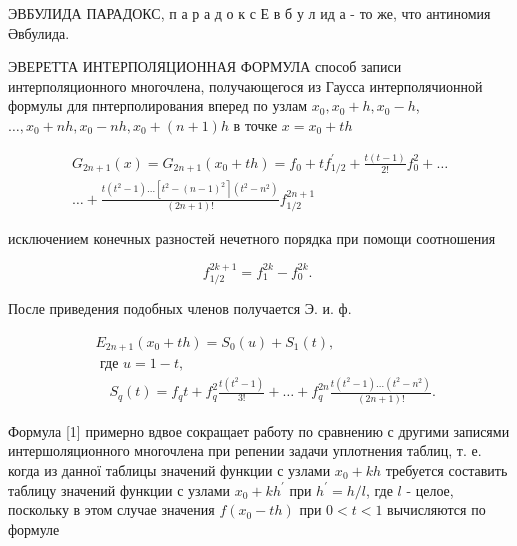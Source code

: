 \documentclass[10pt]{article}
\begin{document}
ЭВБУЛИДА ПАРАДОКС, п а р а д о к с Е в б у л ид а - то же, что антиномия Әвбулида.



ЭВЕРЕТТА ИНТЕРПОЛЯЦИОННАЯ ФОРМУЛА способ записи интерполяционного многочлена, получающегося из Гаусса интерполячионной формулы для пнтерполирования вперед по узлам $x_{0}, x_{0}+h, x_{0}-h$, $\ldots, x_{0}+n h, x_{0}-n h, x_{0}+(n+1) h$ в точке $x=x_{0}+t h$



\[

\begin{gathered}

G_{2 n+1}(x)=G_{2 n+1}\left(x_{0}+t h\right)=f_{0}+t f_{1 / 2}^{\prime}+\frac{t(t-1)}{2 !} f_{0}^{2}+\ldots \\

\ldots+\frac{t\left(t^{2}-1\right) \ldots\left[t^{2}-(n-1)^{2}\right\rceil\left(t^{2}-n^{2}\right)}{(2 n+1) !} f_{1 / 2}^{2 n+1}

\end{gathered}

\]



исключением конечных разностей нечетного порядка при помощи соотношения



\[

f_{1 / 2}^{2 k+1}=f_{1}^{2 k}-f_{0}^{2 k} \text {. }

\]



После приведения подобных членов получается Э. и. ф.



\[

\begin{aligned}

& E_{2 n+1}\left(x_{0}+t h\right)=S_{0}(u)+S_{1}(t), \\

& \text { где } u=1-t, \\

& \quad S_{q}(t)=f_{q} t+f_{q}^{2} \frac{t\left(t^{2}-1\right)}{3 !}+\ldots+f_{q}^{2 n} \frac{t\left(t^{2}-1\right) \ldots\left(t^{2}-n^{2}\right)}{(2 n+1) !} .

\end{aligned}

\]



Формула [1] примерно вдвое сокращает работу по сравнению с другими записями интершоляционного многочлена при репении задачи уплотнения таблиц, т. е. когда из данної таблицы значений функции с узлами $x_{0}+k h$ требуется составить таблицу значений функции с узлами $x_{0}+k h^{\prime}$ при $h^{\prime}=h / l$, где $l$ - целое, поскольку в этом случае значения $f\left(x_{0}-t h\right)$ при $0<t<1$ вычисляются по формуле
\end{document}
